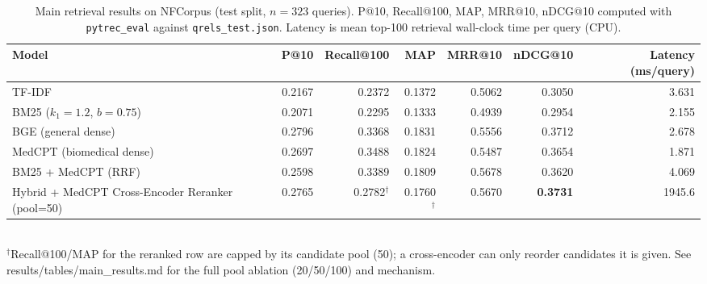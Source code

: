 \begin{table}[t]
  \centering
  \caption{Main retrieval results on NFCorpus (test split, $n=323$ queries).
    P@10, Recall@100, MAP, MRR@10, nDCG@10 computed with \texttt{pytrec\_eval}
    against \texttt{qrels\_test.json}. Latency is mean top-100 retrieval
    wall-clock time per query (CPU).}
  \label{tab:main-results}
  \begin{tabular}{lrrrrrr}
    \toprule
    Model & P@10 & Recall@100 & MAP & MRR@10 & nDCG@10 & Latency (ms/query) \\
    \midrule
    TF-IDF                                   & 0.2167  & 0.2372  & 0.1372  & 0.5062  & 0.3050  & 3.631 \\
    BM25 ($k_1{=}1.2$, $b{=}0.75$)           & 0.2071  & 0.2295  & 0.1333  & 0.4939  & 0.2954  & 2.155 \\
    BGE (general dense)                      & 0.2796  & 0.3368  & 0.1831  & 0.5556  & 0.3712  & 2.678 \\
    MedCPT (biomedical dense)                & 0.2697  & 0.3488  & 0.1824  & 0.5487  & 0.3654  & 1.871 \\
    BM25 + MedCPT (RRF)                      & 0.2598  & 0.3389  & 0.1809  & 0.5678  & 0.3620  & 4.069 \\
    Hybrid + MedCPT Cross-Encoder Reranker (pool=50) & 0.2765 & 0.2782$^\dagger$ & 0.1760$^\dagger$ & 0.5670 & \textbf{0.3731} & 1945.6 \\
    \bottomrule
  \end{tabular}
  \vspace{2pt}
  \\ \footnotesize{$^\dagger$Recall@100/MAP for the reranked row are capped
  by its candidate pool (50); a cross-encoder can only reorder candidates it
  is given. See results/tables/main\_results.md for the full pool ablation
  (20/50/100) and mechanism.}
\end{table}
